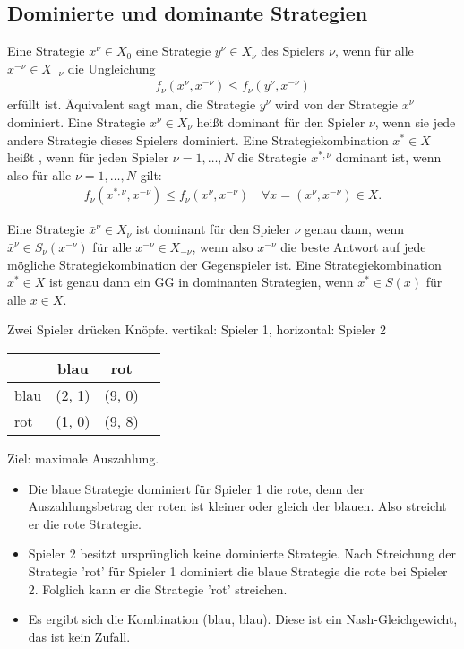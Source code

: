 \subsection{Dominierte und dominante Strategien}
\begin{definition}
  Eine Strategie $x^{\nu} \in X_{0}$  eine Strategie $y^{\nu} \in X_{\nu}$ des Spielers $\nu$, wenn für alle $x^{-\nu} \in X_{-\nu}$ die Ungleichung
  \begin{align*}
    f_{\nu}(x^{\nu}, x^{-\nu})\leq f_{\nu}(y^{\nu}, x^{-\nu})
  \end{align*}
erfüllt ist. Äquivalent sagt man, die Strategie $y^{\nu}$ wird von der Strategie $x^{\nu}$ dominiert. Eine Strategie $x^{\nu} \in X_{\nu}$ heißt dominant für den Spieler $\nu$, wenn sie jede andere Strategie dieses Spielers dominiert. Eine Strategiekombination $x^{*} \in X$ heißt , wenn für jeden Spieler $\nu = 1, \dots, N$ die Strategie $x^{*, \nu}$ dominant ist, wenn also für alle $\nu = 1, \dots, N$ gilt:
\begin{align*}
  f_{\nu}(x^{*, \nu}, x^{-\nu}) \leq f_{\nu}(x^{\nu}, x^{-\nu}) \quad \forall x = (x^{\nu}, x^{-\nu}) \in X. 
\end{align*}
\end{definition}
\begin{satz}
  Eine Strategie $\bar x^{\nu} \in X_{\nu}$ ist dominant für den Spieler $\nu$ genau dann, wenn $\bar x^{\nu} \in S_{\nu}(x^{- \nu})$ für alle $x^{-\nu} \in X_{- \nu}$, wenn also $x^{-\nu}$ die beste Antwort auf jede mögliche Strategiekombination der Gegenspieler ist. Eine Strategiekombination $x^{*} \in X$ ist genau dann ein GG in dominanten Strategien, wenn $x^{*} \in S(x)$ für alle $x \in X$.  
\end{satz}
\begin{beispiel}
Zwei Spieler drücken Knöpfe.
vertikal: Spieler 1, horizontal: Spieler 2

  \begin{tabular}[h!]{l| c c c}
    & blau & rot  \\\hline 
    blau & (2, 1)& (9, 0) \\
    rot & (1, 0)&  (9, 8)
  \end{tabular}  

Ziel: maximale Auszahlung.
\begin{itemize}
\item Die blaue Strategie dominiert für Spieler 1 die rote, denn der Auszahlungsbetrag der roten ist kleiner oder gleich der blauen. Also streicht er die rote Strategie. 
\item Spieler 2 besitzt ursprünglich keine dominierte Strategie. Nach Streichung der Strategie 'rot' für Spieler 1 dominiert die blaue Strategie die rote bei Spieler 2. Folglich kann er die Strategie 'rot' streichen. \item Es ergibt sich die Kombination (blau, blau). Diese ist ein Nash-Gleichgewicht, das ist kein Zufall. 
\end{itemize}
\end{beispiel}
